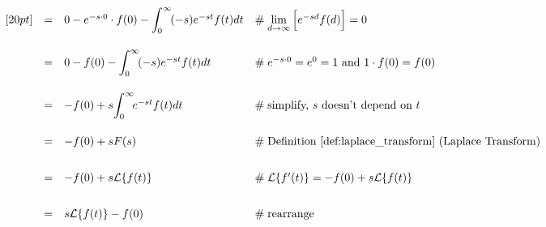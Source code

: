 \documentclass{article}
\theoremstyle{definition}
\begin{document}
\begin{equation*}
\begin{array}{lllll}
[20pt]                                                                                                                                                                                                %
&=& 0  - e^{-s \cdot 0} \cdot f(0)  - \mathlarger{\int}^\infty_0 \!  (-s) e^{-st}  f(t) dt                                                                            &\mathrel{\#} \lim\limits_{d \to \infty}\Big [e^{-sd} f(d) \Big ] = 0                                 \\
[20pt]                                                                                                                                                                                                %
&=& 0 - f(0) - \mathlarger{\int}^\infty_0 \!  (-s) e^{-st}  f(t) dt                                                                                                             &\mathrel{\#} e^{-s \cdot 0} = e^0 = 1 \text{ and } 1 \cdot f(0) = f(0)                          \\
[20pt]                                                                                                                                                                                                %
&=& -f(0) + s \mathlarger{\int}^\infty_0 \!  e^{-st}  f(t) dt                                                                                                                    &\mathrel{\#} \text{simplify, $s$ doesn't depend on $t$}                                           \\
[20pt]                                                                                                                                                                                                 %
&=& -f(0) + s F(s)                                                                                                                                                                              &\mathrel{\#} \text{Definition \ref{def:laplace_transform} (Laplace Transform)}       \\   
[20pt]                                                                                                                                                                                                 %
&=& -f(0) + s \mathcal{L}\{f(t)\}                                                                                                                                                          &\mathrel{\#} \mathcal{L}\{f^\prime(t)\} = -f(0) + s \mathcal{L}\{f(t)\}                       \\   
[20pt]                                                                                                                                                                                                 %
&=& s \mathcal{L}\{f(t)\} - f(0)                                                                                                                                                            &\mathrel{\#} \text{rearrange}                                                                        
\end{array}
\end{equation*}
\end{document}
